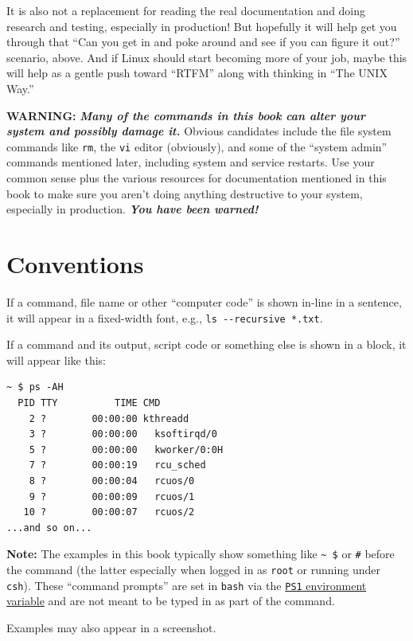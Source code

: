 \documentclass[10pt,]{book}
\numberwithin{figure}{chapter}
\DeclareRobustCommand{\fref}[1]{\ifxetex{(Figure \ref{fig:#1})}\fi}
\begin{document}
It is also not a replacement for reading the real documentation and
doing research and testing, especially in production! But hopefully it
will help get you through that ``Can you get in and poke around and see
if you can figure it out?'' scenario, above. And if Linux should start
becoming more of your job, maybe this will help as a gentle push toward
``RTFM'' along with thinking in ``The UNIX Way.''

\textbf{WARNING:} \textbf{\emph{Many of the commands in this book can
alter your system and possibly damage it.}} Obvious candidates include
the file system commands like \texttt{rm}, the \texttt{vi} editor
(obviously), and some of the ``system admin'' commands mentioned later,
including system and service restarts. Use your common sense plus the
various resources for documentation mentioned in this book to make sure
you aren't doing anything destructive to your system, especially in
production. \textbf{\emph{You have been warned!}}

\section{Conventions}\label{conventions}

If a command, file name or other ``computer code'' is shown in-line in a
sentence, it will appear in a fixed-width font, e.g.,
\texttt{ls -{}-recursive *.txt}.

If a command and its output, script code or something else is shown in a
block, it will appear like this:

\begin{verbatim}
~ $ ps -AH
  PID TTY          TIME CMD
    2 ?        00:00:00 kthreadd
    3 ?        00:00:00   ksoftirqd/0
    5 ?        00:00:00   kworker/0:0H
    7 ?        00:00:19   rcu_sched
    8 ?        00:00:04   rcuos/0
    9 ?        00:00:09   rcuos/1
   10 ?        00:00:07   rcuos/2
...and so on...
\end{verbatim}

\textbf{Note:} The examples in this book typically show something like
\texttt{\textasciitilde{} \$} or \texttt{\#} before the command (the
latter especially when logged in as \texttt{root} or running under
\texttt{csh}). These ``command prompts'' are set in \texttt{bash} via
the
\href{https://www.linux.com/learn/docs/ldp/443-bash-prompt-howto}{\texttt{PS1}
environment variable} and are not meant to be typed in as part of the
command.

Examples \fref{ps-AH} may also appear in a screenshot.
\end{document}
